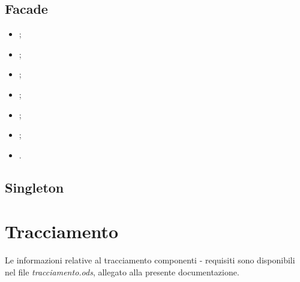 \documentclass[10pt,a4paper,headinclude,footinclude,hidelinks]{scrreprt} %
\begin{document}
	\section{Facade}
	\label{sec:stage:design:pattern:facade}
	\begin{itemize}
	\item {};
	\item {};
	\item {};
	\item {};
	\item {};
	\item {};
	\item {}.
	\end{itemize}

	\section{Singleton}
	\label{sec:stage:design:pattern:singleton}

	\chapter{Tracciamento}
	\label{ch:stage:design:tracciamento}
	Le informazioni relative al tracciamento componenti - requisiti sono disponibili nel file \textit{tracciamento.ods}, allegato alla presente documentazione.
\end{document}
